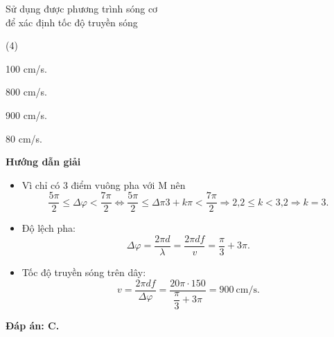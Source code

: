 \begin{dang}{Sử dụng được phương trình sóng cơ\\ để xác định tốc độ truyền sóng}
{		\begin{mcq}(4)
			\item 100 cm/s.
			\item 800 cm/s.
			\item 900 cm/s.
			\item 80 cm/s.
		\end{mcq}
	}{
		\begin{center}
			\textbf{Hướng dẫn giải}
		\end{center}
		
		\begin{itemize}
			\item Vì chỉ có 3 điểm vuông pha với M nên
			\begin{equation*}
				\dfrac{5\pi}{2} \leq \Delta \varphi < \dfrac{7\pi}{2} \Leftrightarrow  \dfrac{5\pi}{2} \leq \Delta{\pi}{3} +k\pi < \dfrac{7\pi}{2} \Rightarrow \text{2,2} \leq k < \text {3,2} \Rightarrow k =3. 
			\end{equation*}
			\item Độ lệch pha:
			\begin{equation*}
				\Delta \varphi = \dfrac{2\pi d}{\lambda} = \dfrac{2\pi df}{v} = \dfrac{\pi}{3} + 3\pi.
			\end{equation*}
			\item Tốc độ truyền sóng trên dây:
			\begin{equation*}
				v=\dfrac{2\pi df}{\Delta \varphi} = \dfrac{20\pi \cdot 150}{\dfrac{\pi}{3} + 3\pi} =  900 \ \text{cm/s}.
			\end{equation*}
		\end{itemize}
		
		\textbf{Đáp án: C.}
		
	}
	
\end{dang}